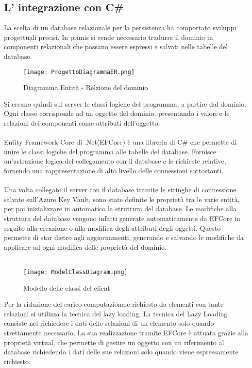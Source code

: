 \clearpage




\clearpage




\subsection{L' integrazione con C\#}

La scelta di un database relazionale per la persistenza ha comportato sviluppi progettuali precisi.
In primis si rende necessario tradurre il dominio in componenti relazionali che possano essere espressi e salvati nelle tabelle del database.

\begin{figure}[h!]
    \centering
    \texttt{[image: ProgettoDiagrammaER.png]}
    \caption{Diagramma Entità - Relzione del dominio}
\end{figure}

Si creano quindi sul server le classi logiche del programma, a partire dal dominio.
Ogni classe corrisponde ad un oggetto del dominio, presentando i valori e le relazioni dei componenti come attributi dell’oggetto.\\
\\
Entity Framework Core di .Net(EFCore) è una libreria di C\# che permette di unire le classi logiche del programma alle tabelle del database.
Fornisce un’astrazione logica del collegamento con il database e le richieste relative, fornendo una rappresentazione di alto livello delle connessioni sottostanti. \\
\\
Una volta collegato il server con il database tramite le stringhe di connessione salvate sull’Azure Key Vault,
sono state definite le proprietà tra le varie entità, per poi inizializzare in automatico la struttura del database.
Le modifiche alla struttura del database vengono infatti generate automaticamente da EFCore in seguito alla creazione o alla modifica degli attributi degli oggetti.
Questo permette di star dietro agli aggiornamenti, generando e salvando le modifiche da applicare ad ogni modifica delle proprietà del dominio.\\
\\
\begin{figure}[h!]
    \begin{center}
        \texttt{[image: ModelClassDiagram.png]}
        \caption{Modello delle classi del client}
    \end{center}
\end{figure}

Per la riduzione del carico computazionale richiesto da elementi con tante relazioni si utilizza la tecnica del lazy loading.
La tecnica del Lazy Loading consiste nel richiedere i dati delle relazioni di un elemento solo quando strettamente necessario.
La sua realizzazione tramite EFCore è attuata grazie alla proprietà virtual,
che permette di gestire un oggetto con un riferimento al database richiedendo i dati delle sue relazioni solo quando viene espressamente richiesto.
\clearpage
